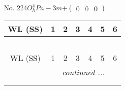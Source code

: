 \documentclass[fleqn,9pt,landscape]{jsarticle}
\begin{document}
\newpage
No. 224\quad$O_{h}^{4}$\quad$Pn-3m$\quad[ cubic ]\quad$+\begin{pmatrix} 0 & 0 & 0 \end{pmatrix}$
\begin{center}
\renewcommand{\arraystretch}{1.2}
\begin{longtable}{ccccccc}
 \hline \hline
WL (SS) & 1 & 2 & 3 & 4 & 5 & 6 \\ \hline \endfirsthead

\multicolumn{6}{l}{\tablename\ \thetable{}} \\
 \hline \hline
WL (SS) & 1 & 2 & 3 & 4 & 5 & 6 \\ \hline \endhead

 \hline \hline
\multicolumn{6}{r}{\footnotesize\it continued ...} \\ \endfoot

 \hline \hline
\multicolumn{6}{r}{} \\ \endlastfoot


\end{longtable}
\end{center}
\end{document}
